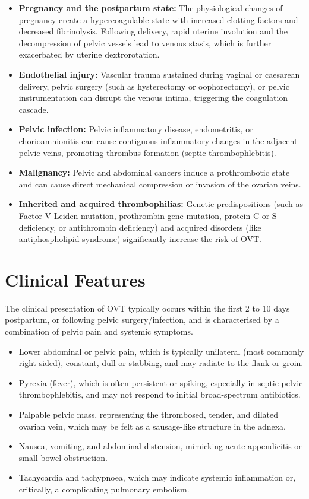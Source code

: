 \begin{itemize}
    \item \textbf{Pregnancy and the postpartum state:} The physiological changes of pregnancy create a hypercoagulable state with increased clotting factors and decreased fibrinolysis. Following delivery, rapid uterine involution and the decompression of pelvic vessels lead to venous stasis, which is further exacerbated by uterine dextrorotation.
    \item \textbf{Endothelial injury:} Vascular trauma sustained during vaginal or caesarean delivery, pelvic surgery (such as hysterectomy or oophorectomy), or pelvic instrumentation can disrupt the venous intima, triggering the coagulation cascade.
    \item \textbf{Pelvic infection:} Pelvic inflammatory disease, endometritis, or chorioamnionitis can cause contiguous inflammatory changes in the adjacent pelvic veins, promoting thrombus formation (septic thrombophlebitis).
    \item \textbf{Malignancy:} Pelvic and abdominal cancers induce a prothrombotic state and can cause direct mechanical compression or invasion of the ovarian veins.
    \item \textbf{Inherited and acquired thrombophilias:} Genetic predispositions (such as Factor V Leiden mutation, prothrombin gene mutation, protein C or S deficiency, or antithrombin deficiency) and acquired disorders (like antiphospholipid syndrome) significantly increase the risk of OVT.
\end{itemize}

\section*{Clinical Features}
The clinical presentation of OVT typically occurs within the first 2 to 10 days postpartum, or following pelvic surgery/infection, and is characterised by a combination of pelvic pain and systemic symptoms.

\begin{itemize}
    \item Lower abdominal or pelvic pain, which is typically unilateral (most commonly right-sided), constant, dull or stabbing, and may radiate to the flank or groin.
    \item Pyrexia (fever), which is often persistent or spiking, especially in septic pelvic thrombophlebitis, and may not respond to initial broad-spectrum antibiotics.
    \item Palpable pelvic mass, representing the thrombosed, tender, and dilated ovarian vein, which may be felt as a sausage-like structure in the adnexa.
    \item Nausea, vomiting, and abdominal distension, mimicking acute appendicitis or small bowel obstruction.
    \item Tachycardia and tachypnoea, which may indicate systemic inflammation or, critically, a complicating pulmonary embolism.
\end{itemize}

